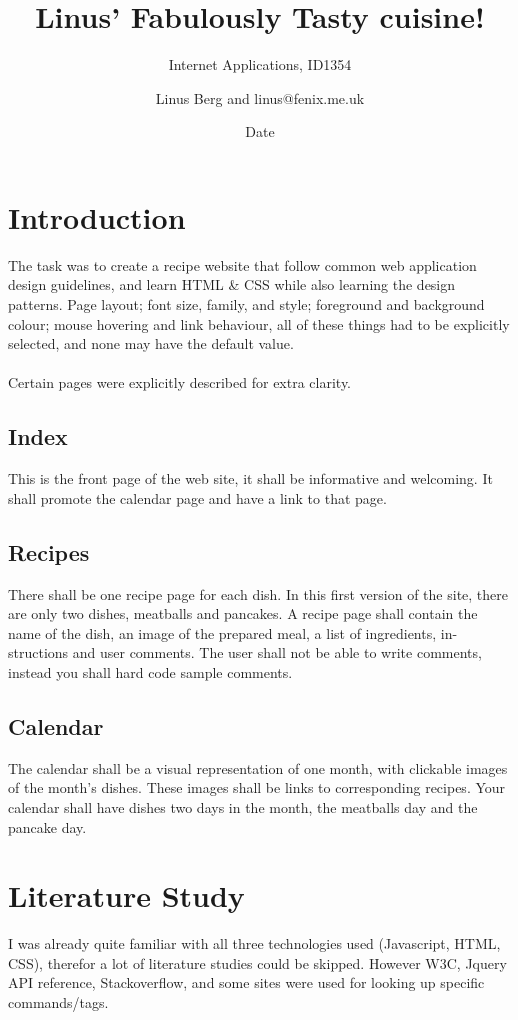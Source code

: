 \documentclass[a4paper]{scrartcl}
\title{Linus' Fabulously Tasty cuisine!}
\subtitle{Internet Applications, ID1354}
\author{Linus Berg and linus@fenix.me.uk}
\date{Date}
\begin{document}
\maketitle

\section{Introduction}

\noindent The task was to create a recipe website that follow common web application design guidelines, and
learn HTML \& CSS while also learning the design patterns. Page layout; font size, family, and style;
foreground and background colour; mouse hovering and link behaviour, all of these things had to be
explicitly selected, and none may have the default value.\\\\
\noindent Certain pages were explicitly described for extra clarity.
\subsection{Index}
This is the front page of the web site, it shall be
informative and welcoming.  It shall promote
the calendar page and have a link to that page.

\subsection{Recipes}
There shall be one recipe page for each dish. In
this first version of the site, there are only two
dishes, meatballs and pancakes.  A recipe page
shall contain the name of the dish, an image
of the prepared meal, a list of ingredients, in-
structions and user comments. The user shall
not be able to write comments, instead  you
shall hard code sample comments.

\subsection{Calendar}
The calendar shall be a visual representation of one month, with clickable images of the
month’s dishes. These images shall be links to corresponding recipes. Your calendar
shall have dishes two days in the month, the meatballs day and the pancake day.

\section{Literature Study}
I was already quite familiar with all three technologies used (Javascript, HTML, CSS),
therefor a lot of literature studies could be skipped.
However W3C, Jquery API reference, Stackoverflow, and some sites were used for looking up
specific commands/tags.
\end{document}
